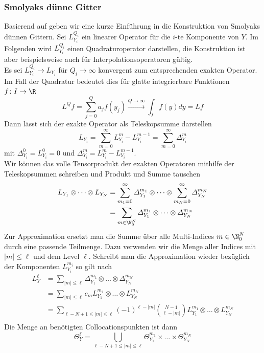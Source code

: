 \subsubsection{Smolyaks dünne Gitter}
Basierend auf \autocite{ConradMarzouk} geben wir eine kurze Einführung in die Konstruktion von Smolyaks dünnen Gittern. Sei $L_{Y_i}^{Q_i}$ ein linearer Operator für die $i$-te Komponente von $Y$. Im Folgenden wird $L_{Y_i}^{Q_i}$ einen Quadraturoperator darstellen, die Konstruktion ist aber beispielsweise auch für Interpolationsoperatoren gültig.\\
Es sei $L_{Y_i}^{Q_i}\to L_{Y_i}$ für $Q_i\to\infty$ konvergent zum entsprechenden exakten Operator. Im Fall der Quadratur bedeutet dies für glatte integrierbare Funktionen $f\colon I\to\R$
\[L^Qf=\sum_{j=0}^Q a_jf(y_j)\xrightarrow[]{Q\to\infty}\int_If(y)dy=Lf\]
Dann lässt sich der exakte Operator als Teleskopsumme darstellen
\[L_{Y_i}=\sum_{m=0}^\infty L_{Y_i}^m - L_{Y_i}^{m-1}=\sum_{m=0}^\infty \varDelta_{Y_i}^m\]
mit $\varDelta_{Y_i}^0=L_{Y_i}^0=0$ und $\varDelta_{Y_i}^m=L_{Y_i}^m-L_{Y_i}^{m-1}$.\\
Wir können das volle Tensorprodukt der exakten Operatoren mithilfe der Teleskopsummen schreiben und Produkt und Summe tauschen
\begin{align*}
L_{Y_1}\otimes\dots\otimes L_{Y_N}&=\sum_{m_1=0}^\infty \varDelta_{Y_1}^{m_1}\otimes\dots\otimes \sum_{m_N=0}^\infty\varDelta_{Y_N}^{m_N}\\
&=\sum_{m\in\N_0^N} \varDelta_{Y_1}^{m_1}\otimes\dots\otimes \varDelta_{Y_N}^{m_N}\\
\end{align*}
Zur Approximation ersetzt man die Summe über alle Multi-Indices $m\in\N_0^N$ durch eine passende Teilmenge. Dazu verwenden wir die Menge aller Indices mit $|m|\le \ell$ und dem Level $\ell$. Schreibt man die Approximation wieder bezüglich der Komponenten $L_{Y_i}^{m_i}$ so gilt nach \autocite{NoTeWe07}
\begin{align*}
L_Y^\ell &= \sum_{|m|\le \ell} \varDelta_{Y_1}^{m_1}\otimes\dots\otimes \varDelta_{Y_N}^{m_N}\\
&= \sum_{|m|\le \ell} c_m L_{Y_1}^{m_1}\otimes\dots\otimes L_{Y_N}^{m_N}\\
&= \sum_{\ell - N+1\le |m|\le \ell} (-1)^{\ell - |m|}\binom{N-1}{\ell - |m|}L_{Y_1}^{m_1}\otimes\dots\otimes L_{Y_N}^{m_N}\\
\end{align*}
Die Menge an benötigten Collocationspunkten ist dann 
\[\Theta_Y^\ell=\bigcup_{\ell - N+1\le |m|\le \ell} \Theta_{Y_1}^{m_1}\times\dots\times \Theta_{Y_N}^{m_N}\]
